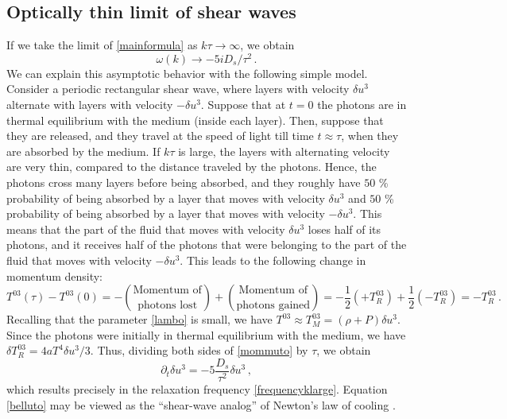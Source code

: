 \documentclass[a4paper, amsfonts, amssymb, amsmath, reprint, showkeys, nofootinbib, twoside,notitlepage,onecolumn]{revtex4-2}
\theoremstyle{definition}
\theoremstyle{theorem}
\theoremstyle{corollary}
\begin{document}
\subsection{Optically thin limit of shear waves}


If we take the limit of \eqref{mainformula} as $k\tau \rightarrow \infty$, we obtain
\begin{equation}\label{frequencyklarge}
\omega(k) \longrightarrow -5iD_s/\tau^2 \, .
\end{equation}
We can explain this asymptotic behavior with the following simple model. Consider a periodic rectangular shear wave, where layers with velocity $\delta u^3$ alternate with layers with velocity $-\delta u^3$. Suppose that at $t=0$ the photons are in thermal equilibrium with the medium (inside each layer). Then, suppose that they are released, and they travel at the speed of light till time $t \approx \tau$, when they are absorbed by the medium. If $k\tau$ is large, the layers with alternating velocity are very thin, compared to the distance traveled by the photons. Hence, the photons cross many layers before being absorbed, and they roughly have $50$ \% probability of being absorbed by a layer that moves with velocity $\delta u^3$ and $50$ \% probability of being absorbed by a layer that moves with velocity $-\delta u^3$. This means that the part of the fluid that moves with velocity $\delta u^3$ loses half of its photons, and it receives half of the photons that were belonging to the part of the fluid that moves with velocity $-\delta u^3$. This leads to the following change in momentum density:
\begin{equation}\label{mommuto}
T^{03}(\tau){-}T^{03}(0) =- \binom{\text{Momentum of}}{\text{photons lost}} + \binom{\text{Momentum of}}{\text{photons gained}} = -\dfrac{1}{2} (+T_R^{03}) + \dfrac{1}{2} (-T_R^{03}) = -T_R^{03} \, .
\end{equation}
Recalling that the parameter \eqref{lambo} is small, we have $T^{03} \approx T_M^{03}= (\rho{+}P) \delta u^3$. Since the photons were initially in thermal equilibrium with the medium, we have $\delta T_R^{03}=4aT^4 \delta u^3/3$. Thus, dividing both sides of \eqref{mommuto} by $\tau$, we obtain
\begin{equation}\label{belluto}
\partial_t \delta u^3=- 5 \dfrac{D_s}{\tau^2} \delta u^3 \, ,
\end{equation}
which results precisely in the relaxation frequency \eqref{frequencyklarge}. Equation \eqref{belluto} may be viewed as the ``shear-wave analog'' of Newton's law of cooling \cite[\S 100]{mihalas_book}.
\end{document}
